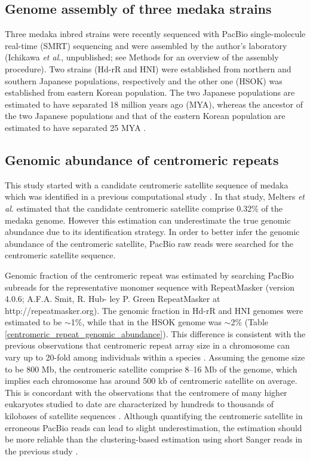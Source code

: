 \subsection*{Genome assembly of three medaka strains}
  Three medaka inbred strains were recently sequenced with PacBio single-molecule real-time (SMRT) sequencing and were assembled by the author's laboratory (Ichikawa \textit{et al}., unpublished; see Methods for an overview of the assembly procedure). Two strains (Hd-rR and HNI) were established from northern and southern Japanese populations, respectively and the other one (HSOK) was established from eastern Korean population. The two Japanese populations are estimated to have separated 18 million years ago (MYA), whereas the ancestor of the two Japanese populations and that of the eastern Korean population are estimated to have separated 25 MYA \cite{Setiamarga2009}.



\subsection*{Genomic abundance of centromeric repeats}
  This study started with a candidate centromeric satellite sequence of medaka which was identified in a previous computational study \cite{Melters2013}. In that study, Melters \textit{et al.} estimated that the candidate centromeric satellite comprise 0.32\% of the medaka genome. However this estimation can underestimate the true genomic abundance due to its identification strategy. In order to better infer the genomic abundance of the centromeric satellite, PacBio raw reads were searched for the centromeric satellite sequence.

  Genomic fraction of the centromeric repeat was estimated by searching PacBio subreads for the representative monomer sequence with RepeatMasker (version 4.0.6; A.F.A. Smit, R. Hub- ley P. Green RepeatMasker at http://repeatmasker.org). The genomic fraction in Hd-rR and HNI genomes were estimated to be $\sim$1\%, while that in the HSOK genome was $\sim$2\% (Table \ref{centromeric_repeat_genomic_abundance}). This difference is consistent with the previous observations that centromeric repeat array size in a chromosome can vary up to 20-fold among individuals within a species \cite{Miga2014}. Assuming the genome size to be 800 Mb, the centromeric satellite comprise 8--16 Mb of the genome, which implies each chromosome has around 500 kb of centromeric satellite on average. This is concordant with the observations that the centromere of many higher eukaryotes studied to date are characterized by hundreds to thousands of kilobases of satellite sequences \cite{Plohl2014}. Although quantifying the centromeric satellite in erroneous PacBio reads can lead to slight underestimation, the estimation should be more reliable than the clustering-based estimation using short Sanger reads in the previous study \cite{Melters2013}.


